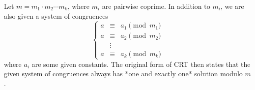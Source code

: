 Let $m = m_1 \cdot m_2 \cdots m_k$, where $m_i$ are pairwise coprime. In addition to $m_i$, we are also given a system of congruences
$$\left\{\begin{array}{rcl}
    a & \equiv & a_1 \pmod{m_1} \\
    a & \equiv & a_2 \pmod{m_2} \\
      & \vdots & \\
    a & \equiv & a_k \pmod{m_k}
\end{array}\right.$$
where $a_i$ are some given constants. The original form of CRT then states that the given system of congruences always has *one and exactly one* solution modulo $m$.